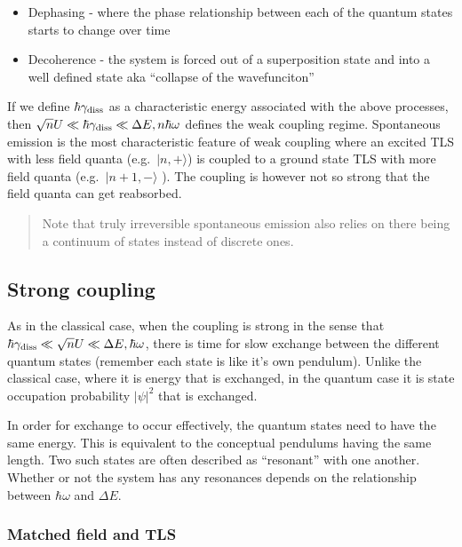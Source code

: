 \documentclass[
]{article}
\renewcommand{\[}{\begin{equation}}
\renewcommand{\]}{\end{equation}}
\providecommand{\tightlist}{%
  \setlength{\itemsep}{0pt}\setlength{\parskip}{0pt}}
\begin{document}
\begin{itemize}
\tightlist
\item
  Dephasing - where the phase relationship between each of the quantum
  states starts to change over time
\item
  Decoherence - the system is forced out of a superposition state and
  into a well defined state aka ``collapse of the wavefunciton''
\end{itemize}

If we define \(\hbar\gamma_{\rm diss}\) as a characteristic energy
associated with the above processes, then
\(\sqrt{n}U \ll \hbar \gamma_{\rm diss} \ll \Delta E , n\hbar \omega\)
defines the weak coupling regime. Spontaneous emission is the most
characteristic feature of weak coupling where an excited TLS with less
field quanta (e.g.~\(|n,+\rangle\)) is coupled to a ground state TLS
with more field quanta (e.g.~\(|n+1,-\rangle\) ). The coupling is
however not so strong that the field quanta can get reabsorbed.

\begin{quote}
Note that truly irreversible spontaneous emission also relies on there
being a continuum of states instead of discrete ones.
\end{quote}

\subsection{Strong coupling}\label{strong-coupling-1}

As in the classical case, when the coupling is strong in the sense that
\(\hbar\gamma_{\rm diss} \ll \sqrt{n}U \ll \Delta E , \hbar \omega\),
there is time for slow exchange between the different quantum states
(remember each state is like it's own pendulum). Unlike the classical
case, where it is energy that is exchanged, in the quantum case it is
state occupation probability \(|\psi|^2\) that is exchanged.

In order for exchange to occur effectively, the quantum states need to
have the same energy. This is equivalent to the conceptual pendulums
having the same length. Two such states are often described as
``resonant'' with one another. Whether or not the system has any
resonances depends on the relationship between \(\hbar \omega\) and
\(\Delta E\).

\subsubsection{Matched field and TLS}\label{matched-field-and-tls}
\end{document}
